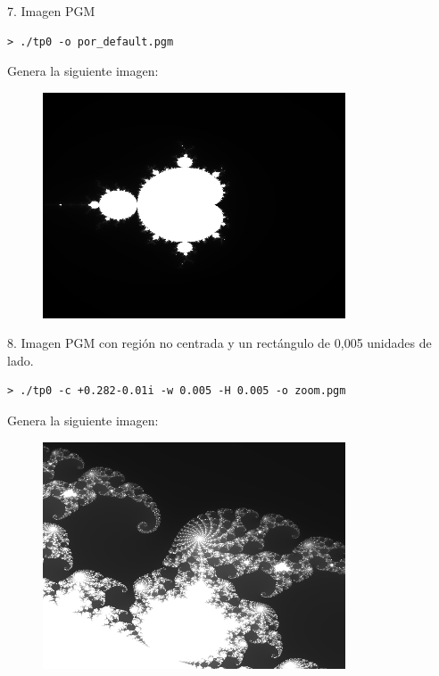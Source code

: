 \documentclass[a4paper,10pt]{article}
\begin{document}
7. Imagen PGM
\begin{verbatim}
> ./tp0 -o por_default.pgm
\end{verbatim}
Genera la siguiente imagen:
\begin{figure}
  \begin{center}
    \includegraphics[width=0.8\textwidth]{por_default.png}
    \label{fig:Region barrida por defecto}
    \caption{}
  \end{center}
\end{figure}



8. Imagen PGM con regi\'on no centrada y un rect\'angulo de 0,005 unidades de lado.
\begin{verbatim}
> ./tp0 -c +0.282-0.01i -w 0.005 -H 0.005 -o zoom.pgm
\end{verbatim}
Genera la siguiente imagen:
\begin{figure}
  \begin{center}
    \includegraphics[width=0.8\textwidth]{zoom.png}
    \label{fig:Region comprendida entre 0,2795 - 0,0075i y 0,2845 - 0,0125i}
    \caption{}
  \end{center}
\end{figure}
\end{document}
